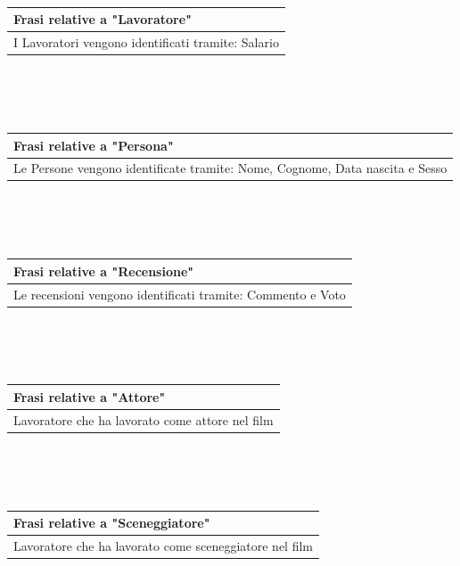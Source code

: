 \documentclass[10pt]{article}
\begin{document}
 	\\\\\\
 	\begin{tabular} { |p{16.8cm}| }
 		\hline
 		\rowcolor{lightgray}
 		\textbf{Frasi relative a "Lavoratore"} \\
 		\hline
 		I Lavoratori vengono identificati tramite: Salario \\
 		\hline 		
 	\end{tabular} 
 	\\\\\\
 	\begin{tabular} { |p{16.8cm}| }
 		\hline
 		\rowcolor{lightgray}
 		\textbf{Frasi relative a "Persona"} \\
 		\hline
 		Le Persone vengono identificate tramite: Nome, Cognome, Data nascita e Sesso \\
 		\hline 		
 	\end{tabular} 
 	\\\\\\
 	\begin{tabular} { |p{16.8cm}| }
 		\hline
 		\rowcolor{lightgray}
 		\textbf{Frasi relative a "Recensione"} \\
 		\hline
 		Le recensioni vengono identificati tramite: Commento e Voto \\
 		\hline 		
 	\end{tabular} 
 	\\\\\\
 	\begin{tabular} { |p{16.8cm}| }
 		\hline
 		\rowcolor{lightgray}
 		\textbf{Frasi relative a "Attore"} \\
 		\hline
 		Lavoratore che ha lavorato come attore nel film \\
 		\hline 		
 	\end{tabular} 
	\\\\\\
	\begin{tabular} { |p{16.8cm}| }
		\hline
		\rowcolor{lightgray}
		\textbf{Frasi relative a "Sceneggiatore"} \\
		\hline
		Lavoratore che ha lavorato come sceneggiatore nel film \\
		\hline 		
	\end{tabular} 
	\\\\\\
\end{document}

